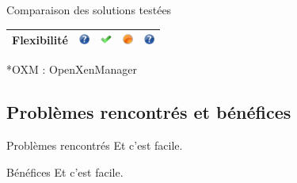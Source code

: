 \documentclass{beamer}
\begin{document}
\begin{frame}{Comparaison des solutions testées}
\begin{center}
\begin{tabular}{|c|c|c|c|c|}
\hline
Flexibilité & \includegraphics[width=10pt]{images_presentation/question.png}& \includegraphics[width=10pt]{images_presentation/ok.png}& \includegraphics[width=10pt]{images_presentation/moyen.png}& \includegraphics[width=10pt]{images_presentation/question.png}\tabularnewline
\hline
\end{tabular}
\end{center}
\newline
*OXM : OpenXenManager
\end{frame}


\subsection{Problèmes rencontrés et bénéfices}
\begin{frame}{Problèmes rencontrés}
  Et c'est facile.
\end{frame}

\begin{frame}{Bénéfices}
  Et c'est facile.
\end{frame}
\end{document}

